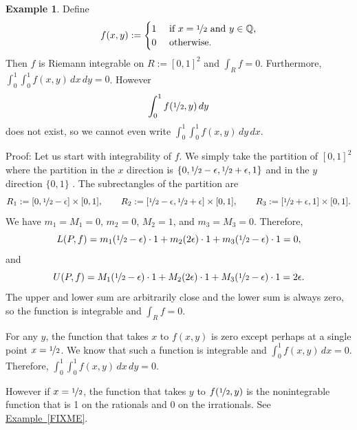\documentclass[12pt]{book}
\newcommand{\Q}{{\mathbb{Q}}}
\theoremstyle{plain}
\theoremstyle{remark}
\theoremstyle{definition}
\theoremstyle{exercise}
\theoremstyle{example}
\newtheorem{example}[thm]{Example}
\newcommand{\exampleref}[1]{\hyperref[#1]{Example~\ref*{#1}}}
\begin{document}
\begin{example}
Define 
\begin{equation*}
f(x,y) := 
\begin{cases}
1 & \text{ if $x=\nicefrac{1}{2}$ and $y \in \Q$,} \\
0 & \text{ otherwise.}
\end{cases}
\end{equation*}
Then $f$ is Riemann integrable on $R := [0,1]^2$ and $\int_R f = 0$.
Furthermore, $\int_0^1 \int_0^1 f(x,y) \, dx \, dy = 0$.
However
\begin{equation*}
\int_0^1 f(\nicefrac{1}{2},y) \, dy
\end{equation*}
does not exist, so we cannot even write $\int_0^1 \int_0^1 f(x,y) \, dy \,
dx$.

Proof:
Let us start with integrability of $f$.  We simply take the partition
of $[0,1]^2$ where the partition in the $x$ direction is
$\{ 0, \nicefrac{1}{2}-\epsilon,
\nicefrac{1}{2}+\epsilon,1\}$ and in the $y$ direction $\{ 0, 1 \}$ .
The subrectangles of the partition are
\begin{equation*}
R_1 := [0,
\nicefrac{1}{2}-\epsilon] \times [0,1],
\qquad
R_2 := [\nicefrac{1}{2}-\epsilon,
\nicefrac{1}{2}+\epsilon] \times [0,1],
\qquad
R_3 := [\nicefrac{1}{2}+\epsilon,1] \times [0,1] .
\end{equation*}
We have $m_1 = M_1 = 0$, $m_2 =0$, $M_2 = 1$, and $m_3 = M_3 = 0$.
Therefore,
\begin{equation*}
L(P,f) = 
m_1 (\nicefrac{1}{2}-\epsilon) \cdot 1
+
m_2 (2\epsilon) \cdot 1
+
m_3 (\nicefrac{1}{2}-\epsilon) \cdot 1 = 0 ,
\end{equation*}
and
\begin{equation*}
U(P,f) = 
M_1 (\nicefrac{1}{2}-\epsilon) \cdot 1
+
M_2 (2\epsilon) \cdot 1
+
M_3 (\nicefrac{1}{2}-\epsilon) \cdot 1 = 2 \epsilon .
\end{equation*}
The upper and lower sum are arbitrarily close and the lower sum is always
zero, so the function is integrable and $\int_R f = 0$.

For any $y$, the function that takes $x$ to $f(x,y)$ is zero except
perhaps at a single point $x=\nicefrac{1}{2}$.  We know that such a
function is integrable and $\int_0^1 f(x,y) \, dx = 0$.  Therefore,
$\int_0^1 \int_0^1 f(x,y) \, dx \, dy = 0$.

However if $x=\nicefrac{1}{2}$, the function that takes $y$ to
$f(\nicefrac{1}{2},y)$ is the nonintegrable function that is
1 on the rationals and 0 on the irrationals.  See \exampleref{FIXME}.
\end{example}
\end{document}
